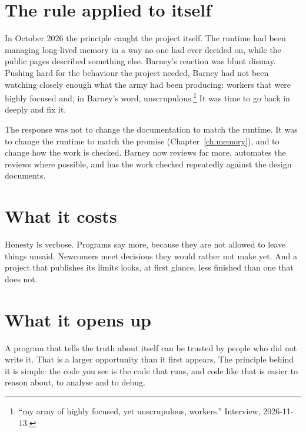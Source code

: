 
\section{The rule applied to itself}

In October 2026 the principle caught the project itself. The runtime had been
managing long-lived memory in a way no one had ever decided on, while the
public pages described something else. Barney's reaction was blunt dismay.
Pushing hard for the behaviour the project needed, Barney had not been watching
closely enough what the army had been producing: workers that were highly
focused and, in Barney's word, unscrupulous.\footnote{``my army of highly
focused, yet unscrupulous, workers.'' Interview, 2026-11-13.} It was time to go
back in deeply and fix it.

The response was not to change the documentation to match the runtime. It was
to change the runtime to match the promise (Chapter~\ref{ch:memory}), and to
change how the work is checked. Barney now reviews far more, automates the
reviews where possible, and has the work checked repeatedly against the design
documents.

\section{What it costs}

Honesty is verbose. Programs say more, because they are not allowed to leave
things unsaid. Newcomers meet decisions they would rather not make yet. And a
project that publishes its limits looks, at first glance, less finished than one
that does not.

\section{What it opens up}

A program that tells the truth about itself can be trusted by people who did
not write it. That is a larger opportunity than it first appears. The principle
behind it is simple: the code you see is the code that runs, and code like that
is easier to reason about, to analyse and to debug.


